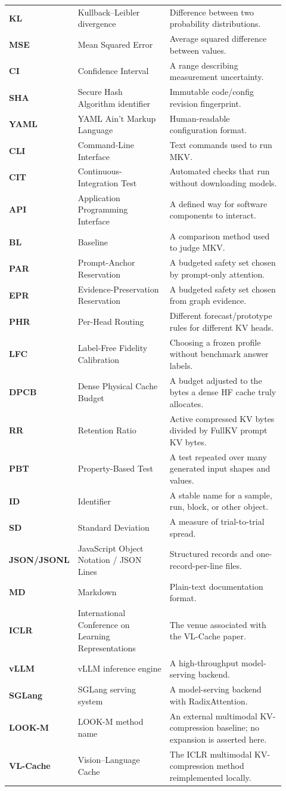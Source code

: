 \documentclass[11pt]{article}
\begin{document}
\begin{longtable}{>{\bfseries}p{0.15\linewidth}p{0.34\linewidth}p{0.43\linewidth}}
KL & Kullback--Leibler divergence & Difference between two probability distributions. \\
MSE & Mean Squared Error & Average squared difference between values. \\
CI & Confidence Interval & A range describing measurement uncertainty. \\
SHA & Secure Hash Algorithm identifier & Immutable code/config revision fingerprint. \\
YAML & YAML Ain't Markup Language & Human-readable configuration format. \\
CLI & Command-Line Interface & Text commands used to run MKV. \\
CIT & Continuous-Integration Test & Automated checks that run without downloading models. \\
API & Application Programming Interface & A defined way for software components to interact. \\
BL & Baseline & A comparison method used to judge MKV. \\
PAR & Prompt-Anchor Reservation & A budgeted safety set chosen by prompt-only attention. \\
EPR & Evidence-Preservation Reservation & A budgeted safety set chosen from graph evidence. \\
PHR & Per-Head Routing & Different forecast/prototype rules for different KV heads. \\
LFC & Label-Free Fidelity Calibration & Choosing a frozen profile without benchmark answer labels. \\
DPCB & Dense Physical Cache Budget & A budget adjusted to the bytes a dense HF cache truly allocates. \\
RR & Retention Ratio & Active compressed KV bytes divided by FullKV prompt KV bytes. \\
PBT & Property-Based Test & A test repeated over many generated input shapes and values. \\
ID & Identifier & A stable name for a sample, run, block, or other object. \\
SD & Standard Deviation & A measure of trial-to-trial spread. \\
JSON/JSONL & JavaScript Object Notation / JSON Lines & Structured records and one-record-per-line files. \\
MD & Markdown & Plain-text documentation format. \\
ICLR & International Conference on Learning Representations & The venue associated with the VL-Cache paper. \\
vLLM & vLLM inference engine & A high-throughput model-serving backend. \\
SGLang & SGLang serving system & A model-serving backend with RadixAttention. \\
LOOK-M & LOOK-M method name & An external multimodal KV-compression baseline; no expansion is asserted here. \\
VL-Cache & Vision--Language Cache & The ICLR multimodal KV-compression method reimplemented locally. \\
\bottomrule
\end{longtable}
\end{document}
